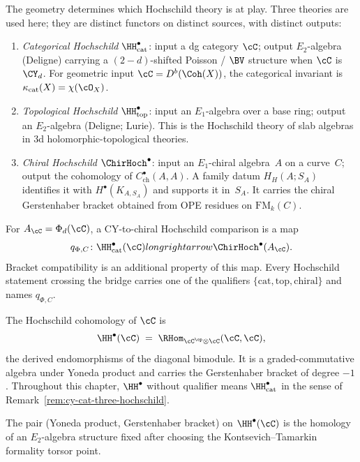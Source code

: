 \begin{remark}
\label{rem:cy-cat-three-hochschild}
The geometry determines which Hochschild theory is at play. Three theories are used here; they are distinct functors on distinct sources, with distinct outputs:
\begin{enumerate}
 \item \emph{Categorical Hochschild} $\HH^\bullet_{\mathrm{cat}}$: input a dg category $\cC$; output $E_2$-algebra (Deligne) carrying a $(2{-}d)$-shifted Poisson / $\BV$ structure when $\cC$ is $\CY_d$. For geometric input $\cC = D^b(\Coh(X))$, the categorical invariant is $\kappa_{\mathrm{cat}}(X) = \chi(\cO_X)$.
 \item \emph{Topological Hochschild} $\HH^\bullet_{\mathrm{top}}$: input an $E_1$-algebra over a base ring; output an $E_2$-algebra (Deligne; Lurie). This is the Hochschild theory of slab algebras in 3d holomorphic-topological theories.
 \item \emph{Chiral Hochschild} $\ChirHoch^\bullet$: input an
 $E_1$-chiral algebra~$A$ on a curve~$C$; output the cohomology of
 $C^\bullet_{\mathrm{ch}}(A,A)$.  A family datum $H_H(A;S_A)$
 identifies it with $H^\bullet(K_{A,S_A})$ and supports it in~$S_A$.
 It carries the chiral Gerstenhaber bracket obtained from OPE residues
 on $\mathrm{FM}_k(C)$.
\end{enumerate}
For $A_\cC=\Phi_d(\cC)$, a CY-to-chiral Hochschild comparison is a
map
\[
 q_{\Phi,C}\colon \HH^\bullet_{\mathrm{cat}}(\cC)longrightarrow
 \ChirHoch^\bullet(A_\cC).
\]
Bracket compatibility is an additional property of this map.  Every
Hochschild statement crossing the bridge carries one of the qualifiers
$\{\mathrm{cat},\mathrm{top},\mathrm{chiral}\}$ and names
$q_{\Phi,C}$.
\end{remark}

\begin{definition}
\label{def:hochschild-cohom}
The Hochschild cohomology of $\cC$ is
\[
 \HH^\bullet(\cC) \;=\; \RHom_{\cC^{\op} \otimes \cC}(\cC, \cC),
\]
the derived endomorphisms of the diagonal bimodule. It is a graded-commutative algebra under Yoneda product and carries the Gerstenhaber bracket of degree $-1$. Throughout this chapter, $\HH^\bullet$ without qualifier means $\HH^\bullet_{\mathrm{cat}}$ in the sense of Remark~\textup{\ref{rem:cy-cat-three-hochschild}}.
\end{definition}

\begin{theorem}
\label{thm:deligne-conjecture}
The pair (Yoneda product, Gerstenhaber bracket) on $\HH^\bullet(\cC)$ is the homology of an $E_2$-algebra structure fixed after choosing the Kontsevich--Tamarkin formality torsor point.
\end{theorem}

